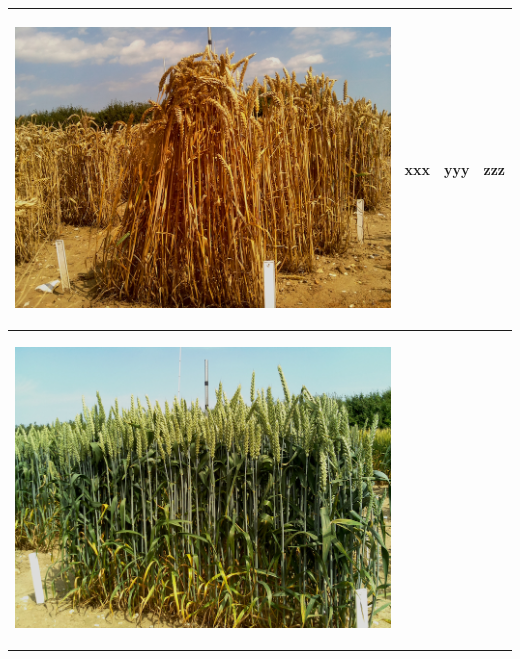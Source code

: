 \begin{table}[h!]
\begin{tabular}{ | c | c | c | c |}
\begin{minipage}{.3\textwidth}
\begin{center}
		\includegraphics[width=\linewidth]{Images/011}
      \end{center}
    \end{minipage}
    &
      xxx
    & 
      yyy
    & 
      zzz
    \\ \hline
    \begin{minipage}{.3\textwidth}
      \begin{center}
		\includegraphics[width=\linewidth]{Images/012}

\end{center}
\end{minipage}
\end{tabular}
\end{table}
